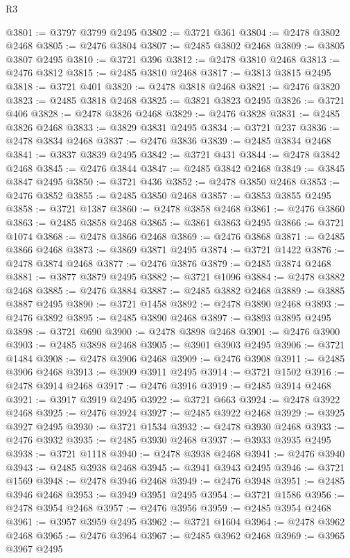 \begin{lexlean}{R3}
\begin{coremodule}
@3801 := @3797 @3799 @2495
@3802 := @3721 @361
@3804 := @2478 @3802 @2468
@3805 := @2476 @3804
@3807 := @2485 @3802 @2468
@3809 := @3805 @3807 @2495
@3810 := @3721 @396
@3812 := @2478 @3810 @2468
@3813 := @2476 @3812
@3815 := @2485 @3810 @2468
@3817 := @3813 @3815 @2495
@3818 := @3721 @401
@3820 := @2478 @3818 @2468
@3821 := @2476 @3820
@3823 := @2485 @3818 @2468
@3825 := @3821 @3823 @2495
@3826 := @3721 @406
@3828 := @2478 @3826 @2468
@3829 := @2476 @3828
@3831 := @2485 @3826 @2468
@3833 := @3829 @3831 @2495
@3834 := @3721 @237
@3836 := @2478 @3834 @2468
@3837 := @2476 @3836
@3839 := @2485 @3834 @2468
@3841 := @3837 @3839 @2495
@3842 := @3721 @431
@3844 := @2478 @3842 @2468
@3845 := @2476 @3844
@3847 := @2485 @3842 @2468
@3849 := @3845 @3847 @2495
@3850 := @3721 @436
@3852 := @2478 @3850 @2468
@3853 := @2476 @3852
@3855 := @2485 @3850 @2468
@3857 := @3853 @3855 @2495
@3858 := @3721 @1387
@3860 := @2478 @3858 @2468
@3861 := @2476 @3860
@3863 := @2485 @3858 @2468
@3865 := @3861 @3863 @2495
@3866 := @3721 @1074
@3868 := @2478 @3866 @2468
@3869 := @2476 @3868
@3871 := @2485 @3866 @2468
@3873 := @3869 @3871 @2495
@3874 := @3721 @1422
@3876 := @2478 @3874 @2468
@3877 := @2476 @3876
@3879 := @2485 @3874 @2468
@3881 := @3877 @3879 @2495
@3882 := @3721 @1096
@3884 := @2478 @3882 @2468
@3885 := @2476 @3884
@3887 := @2485 @3882 @2468
@3889 := @3885 @3887 @2495
@3890 := @3721 @1458
@3892 := @2478 @3890 @2468
@3893 := @2476 @3892
@3895 := @2485 @3890 @2468
@3897 := @3893 @3895 @2495
@3898 := @3721 @690
@3900 := @2478 @3898 @2468
@3901 := @2476 @3900
@3903 := @2485 @3898 @2468
@3905 := @3901 @3903 @2495
@3906 := @3721 @1484
@3908 := @2478 @3906 @2468
@3909 := @2476 @3908
@3911 := @2485 @3906 @2468
@3913 := @3909 @3911 @2495
@3914 := @3721 @1502
@3916 := @2478 @3914 @2468
@3917 := @2476 @3916
@3919 := @2485 @3914 @2468
@3921 := @3917 @3919 @2495
@3922 := @3721 @663
@3924 := @2478 @3922 @2468
@3925 := @2476 @3924
@3927 := @2485 @3922 @2468
@3929 := @3925 @3927 @2495
@3930 := @3721 @1534
@3932 := @2478 @3930 @2468
@3933 := @2476 @3932
@3935 := @2485 @3930 @2468
@3937 := @3933 @3935 @2495
@3938 := @3721 @1118
@3940 := @2478 @3938 @2468
@3941 := @2476 @3940
@3943 := @2485 @3938 @2468
@3945 := @3941 @3943 @2495
@3946 := @3721 @1569
@3948 := @2478 @3946 @2468
@3949 := @2476 @3948
@3951 := @2485 @3946 @2468
@3953 := @3949 @3951 @2495
@3954 := @3721 @1586
@3956 := @2478 @3954 @2468
@3957 := @2476 @3956
@3959 := @2485 @3954 @2468
@3961 := @3957 @3959 @2495
@3962 := @3721 @1604
@3964 := @2478 @3962 @2468
@3965 := @2476 @3964
@3967 := @2485 @3962 @2468
@3969 := @3965 @3967 @2495

\end{coremodule}
\end{lexlean}
